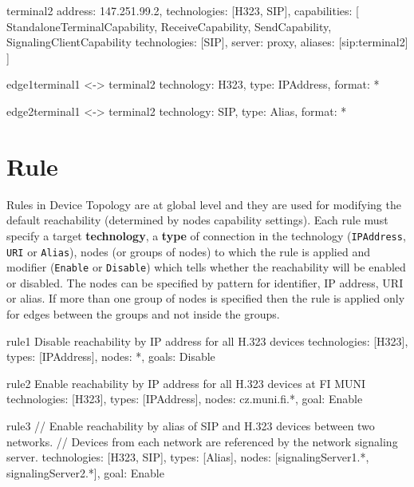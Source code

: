 \begin{EntityExample}{}{terminal2}{}
address: 147.251.99.2,
technologies: [H323, SIP],
capabilities: [
  StandaloneTerminalCapability,
  ReceiveCapability,
  SendCapability,
  SignalingClientCapability {technologies: [SIP], server: proxy, 
    aliases: [sip:terminal2]}
]
\end{EntityExample}

\begin{EntityExample}{}{edge1}{terminal1 <-> terminal2}
technology: H323,
type: IPAddress,
format: *
\end{EntityExample}

\begin{EntityExample}{}{edge2}{terminal1 <-> terminal2}
technology: SIP,
type: Alias,
format: *
\end{EntityExample} 
  
  
\section{Rule}
Rules in Device Topology are at global level and they are used for modifying 
the default reachability (determined by nodes capability settings). Each rule 
must specify a target \textbf{technology}, a \textbf{type} of connection in 
the technology (\verb|IPAddress|, \verb|URI| or \verb|Alias|), 
nodes (or groups of nodes) 
to which the rule is applied and modifier (\verb|Enable| or \verb|Disable|) 
which tells whether the reachability will be enabled or disabled. The nodes 
can be specified by pattern for identifier, IP address, URI or alias. If more than 
one group of nodes is specified then the rule is applied only for edges 
between the groups and not inside the groups.

\begin{EntityExample}{}{rule1}%
      {Disable reachability by IP address for all H.323 devices}
technologies: [H323],
types: [IPAddress],
nodes: *,
goals: Disable
\end{EntityExample}

\begin{EntityExample}{}{rule2}%
      {Enable reachability by IP address for all H.323 devices at FI MUNI}
technologies: [H323],
types: [IPAddress],
nodes: cz.muni.fi.*,
goal: Enable
\end{EntityExample}

\begin{EntityExample}{}{rule3}{}
// Enable reachability by alias of SIP and H.323 devices between two networks.
// Devices from each network are referenced by the network signaling server.
technologies: [H323, SIP],
types: [Alias],
nodes: [signalingServer1.*, signalingServer2.*],
goal: Enable
\end{EntityExample}

